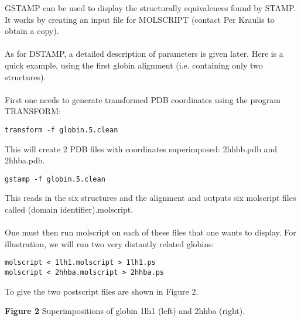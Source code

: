 GSTAMP can be used to display the structurally equivalences found by 
STAMP.  It works by creating an input file for MOLSCRIPT \cite{molscript} 
(contact Per Kraulis to obtain a copy).\\
\\
As for DSTAMP, a detailed description of parameters is given later. Here 
is a quick example, using the first globin alignment (i.e. containing only
two structures).\\
\\
First one needs to generate transformed PDB coordinates using the program 
TRANSFORM:

\begin{scriptsize}\begin{verbatim}
transform -f globin.5.clean
\end{verbatim} \end{scriptsize}

This will create 2 PDB files with coordinates superimposed: 2hhbb.pdb and 2hhba.pdb.\\

\begin{scriptsize}\begin{verbatim}
gstamp -f globin.5.clean
\end{verbatim} \end{scriptsize}

This reads in the six structures and the alignment and outputs six
molscript files called (domain identifier).molscript.\\
\\
One must then run molscript on each of these files that one wants to display.  For illustration,
we will run two very distantly related globins:

\begin{scriptsize}\begin{verbatim}
molscript < 1lh1.molscript > 1lh1.ps
molscript < 2hhba.molscript > 2hhba.ps
\end{verbatim} \end{scriptsize}

To give the two postscript files are shown in Figure 2.\\

\vspace*{3.5in}
\noindent
\begin{scriptsize}
{\bf Figure 2} Superimpositions of globin 1lh1 (left) and 2hhba (right).\\
\end{scriptsize}

